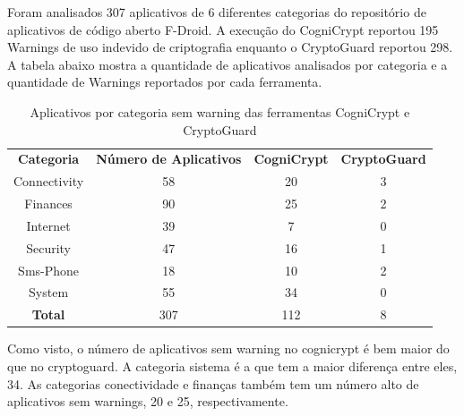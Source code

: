 Foram analisados 307 aplicativos de 6 diferentes categorias do repositório de aplicativos de código aberto F-Droid. \cite{perception_developers}
A execução do CogniCrypt reportou 195 Warnings de uso indevido de criptografia enquanto o CryptoGuard reportou 298. \cite{perception_developers}
A tabela abaixo mostra a quantidade de aplicativos analisados por categoria e a quantidade de Warnings reportados por cada ferramenta. \cite{perception_developers}

\begin{table}[!htbp]
  \centering
  \begin{tabular}{|c|c|c|c|}
  
    \textbf{Categoria}   & \textbf{Número de Aplicativos}   &  \textbf{CogniCrypt}     &  \textbf{CryptoGuard} \\ 
     Connectivity           & \num{58}                         &  \num{20}                    & \num{3}                     \\
Finances                & \num{90}                         &  \num{25}                    & \num{2}                     \\
Internet                 & \num{39}                         &  \num{7}                      &     \num{0}                  \\
Security                 & \num{47}                         &  \num{16}                    &     \num{1}                  \\
Sms-Phone            & \num{18}                         &  \num{10}                     &     \num{2}                 \\
System                  & \num{55}                        &   \num{34}                    &     \num{0}                  \\
\textbf{Total}        & \num{307}                      &   \num{112}                  &     \num{8}                   \\
\end{tabular}
    
  \caption{Aplicativos por categoria sem warning das ferramentas CogniCrypt e CryptoGuard}
\label{AplicativosSemWarning}
\end{table}

Como visto, o número de aplicativos sem warning no cognicrypt é bem maior do que no cryptoguard. A categoria sistema é a que tem a maior diferença entre eles, \num{34}. As categorias conectividade e finanças também tem um número alto de aplicativos sem warnings, \num{20} e \num{25}, respectivamente. \cite{perception_developers}

